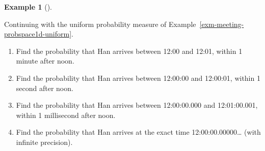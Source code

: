 \documentclass[
  letterpaper,
  DIV=11,
  numbers=noendperiod]{scrreprt}
\providecommand{\tightlist}{%
  \setlength{\itemsep}{0pt}\setlength{\parskip}{0pt}}
\theoremstyle{plain}
\theoremstyle{definition}
\newtheorem{example}{Example}[chapter]
\theoremstyle{definition}
\theoremstyle{definition}
\theoremstyle{remark}
\begin{document}
\begin{tcolorbox}[enhanced jigsaw, opacityback=0, left=2mm, colframe=quarto-callout-note-color-frame, toprule=.15mm, breakable, colback=white, leftrule=.75mm, arc=.35mm, rightrule=.15mm, bottomrule=.15mm]

\begin{example}[]\protect\hypertarget{exm-meeting-probspace1d-limit}{}\label{exm-meeting-probspace1d-limit}

Continuing with the uniform probability measure of
Example~\ref{exm-meeting-probspace1d-uniform}.

\begin{enumerate}
\def\labelenumi{\arabic{enumi}.}
\tightlist
\item
  Find the probability that Han arrives between 12:00 and 12:01, within
  1 minute after noon.
\item
  Find the probability that Han arrives between 12:00:00 and 12:00:01,
  within 1 second after noon.
\item
  Find the probability that Han arrives between 12:00:00.000 and
  12:01:00.001, within 1 millisecond after noon.
\item
  Find the probability that Han arrives at the exact time
  12:00:00.00000\ldots{} (with infinite precision).
\end{enumerate}

\end{example}

\end{tcolorbox}
\end{document}

